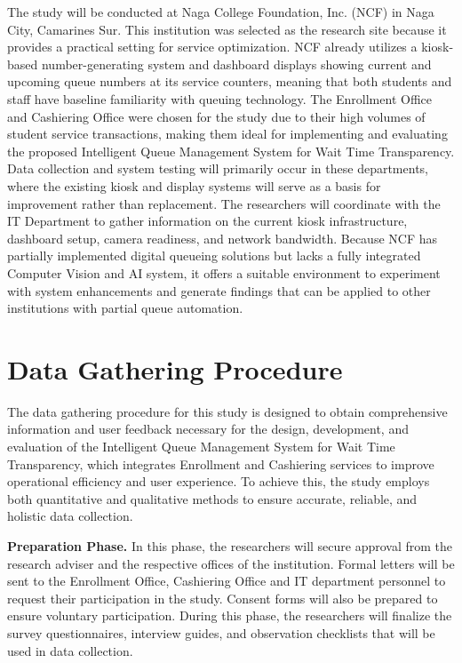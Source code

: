 \documentclass{research}
\begin{document}
The study will be conducted at Naga College Foundation, Inc. (NCF) in Naga City, Camarines Sur. This institution was selected as the research site because it provides a practical setting for service optimization. NCF already utilizes a kiosk-based number-generating system and dashboard displays showing current and upcoming queue numbers at its service counters, meaning that both students and staff have baseline familiarity with queuing technology. The Enrollment Office and Cashiering Office were chosen for the study due to their high volumes of student service transactions, making them ideal for implementing and evaluating the proposed Intelligent Queue Management System for Wait Time Transparency. Data collection and system testing will primarily occur in these departments, where the existing kiosk and display systems will serve as a basis for improvement rather than replacement. The researchers will coordinate with the IT Department to gather information on the current kiosk infrastructure, dashboard setup, camera readiness, and network bandwidth. Because NCF has partially implemented digital queueing solutions but lacks a fully integrated Computer Vision and AI system, it offers a suitable environment to experiment with system enhancements and generate findings that can be applied to other institutions with partial queue automation.	

\section{Data Gathering Procedure}

\hspace{1em}The data gathering procedure for this study is designed to obtain comprehensive information and user feedback necessary for the design, development, and evaluation of the Intelligent Queue Management System for Wait Time Transparency, which integrates Enrollment and Cashiering services to improve operational efficiency and user experience. To achieve this, the study employs both quantitative and qualitative methods to ensure accurate, reliable, and holistic data collection.

\medskip
\textbf{Preparation Phase.} In this phase, the researchers will secure approval from the research adviser and the respective offices of the institution. Formal letters will be sent to the Enrollment Office, Cashiering Office and IT department personnel to request their participation in the study. Consent forms will also be prepared to ensure voluntary participation. During this phase, the researchers will finalize the survey questionnaires, interview guides, and observation checklists that will be used in data collection.
\end{document}
